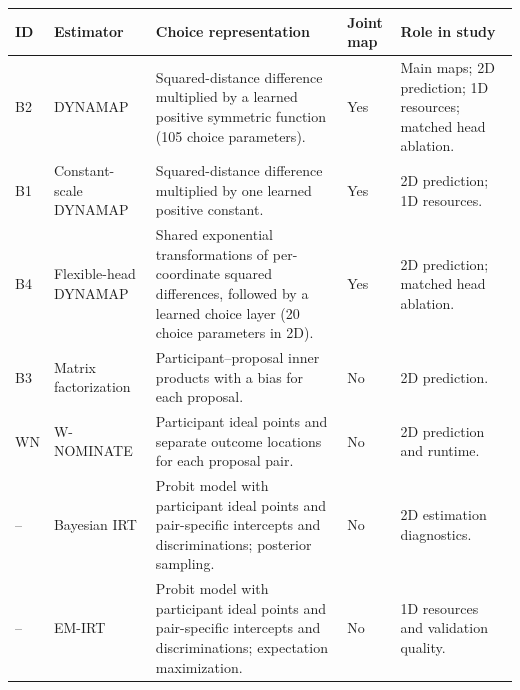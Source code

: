 \begin{tabular}{>{\raggedright\arraybackslash}p{}>{\raggedright\arraybackslash}p{}>{\raggedright\arraybackslash}p{}>{\raggedright\arraybackslash}p{}>{\raggedright\arraybackslash}p{}}
\toprule
ID & Estimator & Choice representation & Joint map & Role in study \\
\midrule
B2 & DYNAMAP & Squared-distance difference multiplied by a learned positive symmetric function (105 choice parameters). & Yes & Main maps; 2D prediction; 1D resources; matched head ablation. \\
B1 & Constant-scale DYNAMAP & Squared-distance difference multiplied by one learned positive constant. & Yes & 2D prediction; 1D resources. \\
B4 & Flexible-head DYNAMAP & Shared exponential transformations of per-coordinate squared differences, followed by a learned choice layer (20 choice parameters in 2D). & Yes & 2D prediction; matched head ablation. \\
B3 & Matrix factorization & Participant--proposal inner products with a bias for each proposal. & No & 2D prediction. \\
WN & W-NOMINATE & Participant ideal points and separate outcome locations for each proposal pair. & No & 2D prediction and runtime. \\
-- & Bayesian IRT & Probit model with participant ideal points and pair-specific intercepts and discriminations; posterior sampling. & No & 2D estimation diagnostics. \\
-- & EM-IRT & Probit model with participant ideal points and pair-specific intercepts and discriminations; expectation maximization. & No & 1D resources and validation quality. \\
\bottomrule
\end{tabular}
